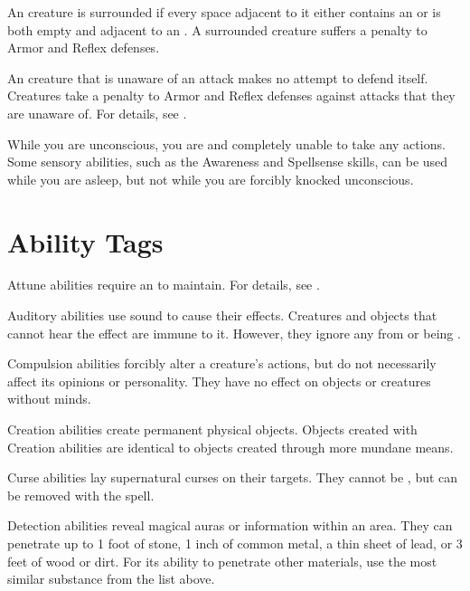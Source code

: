  An creature is surrounded if every space adjacent to it either contains an  or is both empty and adjacent to an .
A surrounded creature suffers a  penalty to Armor and Reflex defenses.

 An creature that is unaware of an attack makes no attempt to defend itself.
Creatures take a  penalty to Armor and Reflex defenses against attacks that they are unaware of.
For details, see .

 While you are unconscious, you are \helpless and completely unable to take any actions.
Some sensory abilities, such as the Awareness and Spellsense skills, can be used while you are asleep, but not while you are forcibly knocked unconscious.

\newpage
\section{Ability Tags}\label{Ability Tags}

 Attune abilities require an  to maintain.
For details, see .

 Auditory abilities use sound to cause their effects.
Creatures and objects that cannot hear the effect are immune to it.
However, they ignore any  from  or being .

 Compulsion abilities forcibly alter a creature's actions, but do not necessarily affect its opinions or personality.
They have no effect on objects or creatures without minds.

 Creation abilities create permanent physical objects.
Objects created with Creation abilities are identical to objects created through more mundane means.

 Curse abilities lay supernatural curses on their targets.
They cannot be , but can be removed with the  spell.

\label{Detection} Detection abilities reveal magical auras or information within an area.
They can penetrate up to 1 foot of stone, 1 inch of common metal, a thin sheet of lead, or 3 feet of wood or dirt.
For its ability to penetrate other materials, use the most similar substance from the list above.

